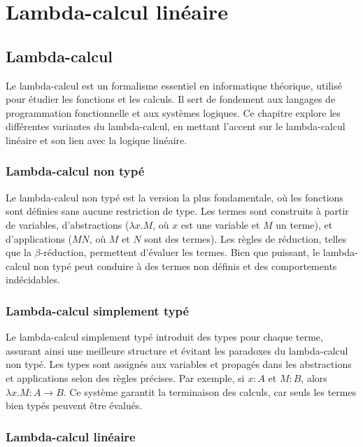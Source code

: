 %
\chapter{Lambda-calcul linéaire}
\label{sec::chapitre2}

\section{Lambda-calcul}

Le lambda-calcul est un formalisme essentiel en informatique théorique, utilisé pour étudier les fonctions et les calculs. Il sert de fondement aux langages de programmation fonctionnelle et aux systèmes logiques. Ce chapitre explore les différentes variantes du lambda-calcul, en mettant l'accent sur le lambda-calcul linéaire et son lien avec la logique linéaire.

\subsection{Lambda-calcul non typé}

Le lambda-calcul non typé est la version la plus fondamentale, où les fonctions sont définies sans aucune restriction de type. Les termes sont construits à partir de variables, d'abstractions (\( \lambda x.M \), où \( x \) est une variable et \( M \) un terme), et d'applications (\( M N \), où \( M \) et \( N \) sont des termes). Les règles de réduction, telles que la \( \beta \)-réduction, permettent d'évaluer les termes. Bien que puissant, le lambda-calcul non typé peut conduire à des termes non définis et des comportements indécidables.

\subsection{Lambda-calcul simplement typé}

Le lambda-calcul simplement typé introduit des types pour chaque terme, assurant ainsi une meilleure structure et évitant les paradoxes du lambda-calcul non typé. Les types sont assignés aux variables et propagés dans les abstractions et applications selon des règles précises. Par exemple, si \( x : A \) et \( M : B \), alors \( \lambda x.M : A \rightarrow B \). Ce système garantit la terminaison des calculs, car seuls les termes bien typés peuvent être évalués.

\subsection{Lambda-calcul linéaire}

